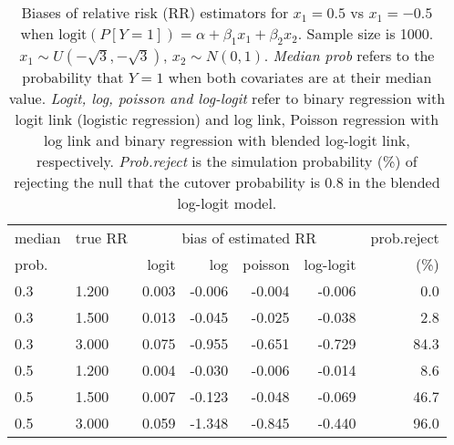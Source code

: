 \documentclass[12pt,a4paper]{article}
\begin{document}
\begin{table}[H] 
\small\sf\centering 
\caption{Biases of relative risk (RR) estimators for $x_1=0.5$ vs $x_1=-0.5$ when $\mbox{logit}(P[Y=1])=\alpha+\beta_1 x_1 + \beta_2 x_2$. Sample size is 1000. $x_1 \sim $$U(-\sqrt{3},-\sqrt{3})$, $x_2 \sim N(0,1)$. {\it Median prob} refers to the probability that $Y=1$ when both covariates are at their median value. {\it Logit, log, poisson and log-logit} refer to binary regression with logit link (logistic regression) and log link, Poisson regression with log link and binary regression with blended log-logit link, respectively. {\it Prob.reject} is the simulation probability (\%) of rejecting the null that the cutover probability is $0.8$ in the blended log-logit model.} 
\begin{tabular}{llrrrrr} 
\toprule 
median & true RR & \multicolumn{4}{c}{bias of estimated RR} & prob.reject \\ 
prob. & & logit & log & poisson & log-logit  & (\%) \\ \midrule 
0.3 & 1.200 & 0.003 & -0.006 & -0.004 & -0.006 &  0.0 \\  
0.3 & 1.500 & 0.013 & -0.045 & -0.025 & -0.038 &  2.8 \\  
0.3 & 3.000 & 0.075 & -0.955 & -0.651 & -0.729 & 84.3 \\  
0.5 & 1.200 & 0.004 & -0.030 & -0.006 & -0.014 &  8.6 \\  
0.5 & 1.500 & 0.007 & -0.123 & -0.048 & -0.069 & 46.7 \\  
0.5 & 3.000 & 0.059 & -1.348 & -0.845 & -0.440 & 96.0 \\  
\bottomrule 
\end{tabular} 
\end{table} 
\end{document}
